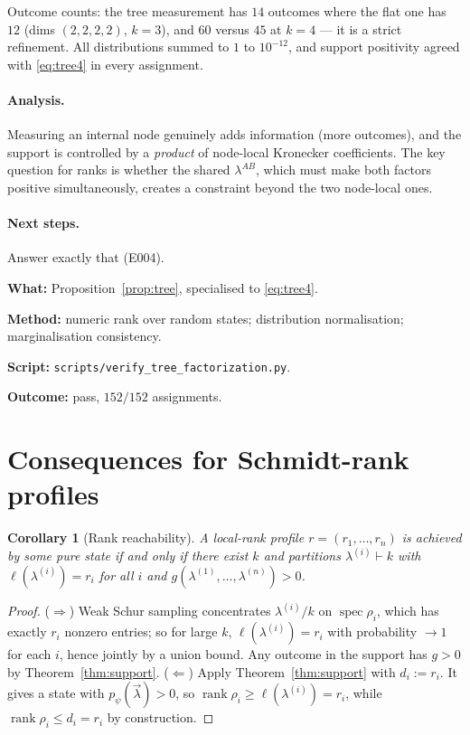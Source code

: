 \documentclass[11pt]{article}
\newtheorem{corollary}[theorem]{Corollary}
\theoremstyle{definition}
\theoremstyle{remark}
\newcommand{\bmlam}{\vec{\lambda}}
\newcommand{\rank}{\operatorname{rank}}
\begin{document}
\medskip
\noindent Outcome counts: the tree measurement has $14$ outcomes where the flat one has
$12$ (dims $(2,2,2,2)$, $k=3$), and $60$ versus $45$ at $k=4$ --- it is a strict
refinement. All distributions summed to $1$ to $10^{-12}$, and support positivity
agreed with \eqref{eq:tree4} in every assignment.

\paragraph{Analysis.}
Measuring an internal node genuinely adds information (more outcomes), and the support
is controlled by a \emph{product} of node-local Kronecker coefficients. The key
question for ranks is whether the shared $\lambda^{AB}$, which must make both factors
positive simultaneously, creates a constraint beyond the two node-local ones.

\paragraph{Next steps.} Answer exactly that (E004).

\begin{verification}
\textbf{What:} Proposition~\ref{prop:tree}, specialised to \eqref{eq:tree4}.

\textbf{Method:} numeric rank over random states; distribution normalisation;
marginalisation consistency.

\textbf{Script:} \texttt{scripts/verify\_tree\_factorization.py}.

\textbf{Outcome:} pass, $152/152$ assignments.
\end{verification}

\section{Consequences for Schmidt-rank profiles}
\label{sec:rank}

\begin{corollary}[Rank reachability]
\label{cor:rank}
A local-rank profile $r = (r_1,\dots,r_n)$ is achieved by some pure state if and only if
there exist $k$ and partitions $\lambda^{(i)} \vdash k$ with $\ell(\lambda^{(i)}) = r_i$
for all $i$ and $g(\lambda^{(1)},\dots,\lambda^{(n)}) > 0$.
\end{corollary}

\begin{proof}
($\Rightarrow$) Weak Schur sampling concentrates $\lambda^{(i)}/k$ on $\operatorname{spec}\rho_i$,
which has exactly $r_i$ nonzero entries; so for large $k$, $\ell(\lambda^{(i)}) = r_i$
with probability $\to 1$ for each $i$, hence jointly by a union bound. Any outcome in
the support has $g > 0$ by Theorem~\ref{thm:support}.
($\Leftarrow$) Apply Theorem~\ref{thm:support} with $d_i := r_i$. It gives a state with
$p_\psi(\bmlam) > 0$, so $\rank\rho_i \ge \ell(\lambda^{(i)}) = r_i$, while
$\rank\rho_i \le d_i = r_i$ by construction.
\end{proof}
\end{document}
